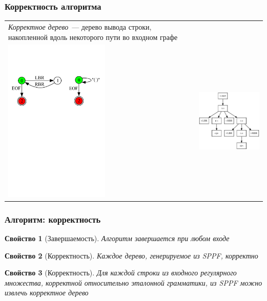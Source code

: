 \documentclass{beamer}
\newtheorem{rutheorem}{Свойство}
\begin{document}
\begin{frame}
\transwipe[direction=90]
\frametitle{Корректность алгоритма}
\begin{tabular}{p{5.3cm} p{6.7cm}}
\emph{Корректное дерево}~--- дерево вывода строки, накопленной вдоль 
некоторого пути во входном графе
&
\\
\includegraphics[width=5cm]{pictures/in31.pdf}
&
\includegraphics[width=6cm]{pictures/sppf2.eps}
\end{tabular}
\end{frame}


\begin{frame}
  \transwipe[direction=90]
  \frametitle{Алгоритм: корректность}
  \begin{rutheorem}[Завершаемость]
  \normalfont	
    Алгоритм завершается при любом входе
  \end{rutheorem}
  
  \begin{rutheorem}[Корректность]
  \normalfont  
    Каждое дерево, генерируемое из SPPF, корректно
  \end{rutheorem}

  \begin{rutheorem}[Корректность]
  \normalfont
    Для каждой строки из входного регулярного множества, корректной 
относительно эталонной грамматики, из SPPF можно извлечь корректное дерево 
  \end{rutheorem}
\end{frame}
\end{document}
